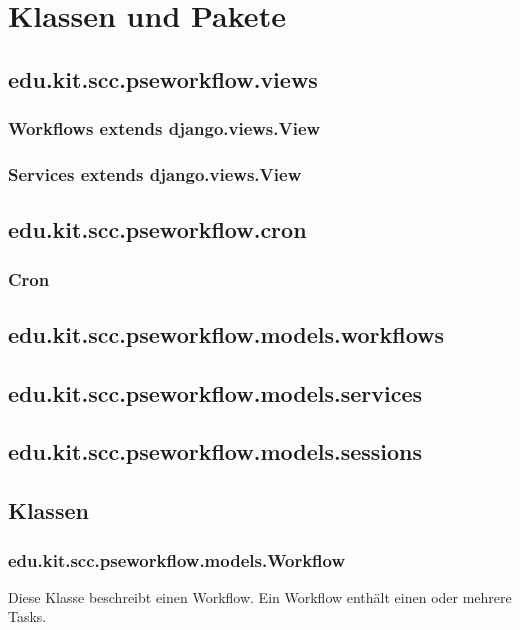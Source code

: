 \chapter{Klassen und Pakete}

    \section{edu.kit.scc.pseworkflow.views}

		\subsection{Workflows\newline
		extends django.views.View}

		\subsection{Services\newline
		extends django.views.View}

    \section{edu.kit.scc.pseworkflow.cron}

		\subsection{Cron}

    \section{edu.kit.scc.pseworkflow.models.workflows}

    \section{edu.kit.scc.pseworkflow.models.services}

    \section{edu.kit.scc.pseworkflow.models.sessions}
        
    \section{Klassen}
        \subsection{edu.kit.scc.pseworkflow.models.Workflow}
	        Diese Klasse beschreibt einen Workflow. Ein Workflow enthält einen oder mehrere Tasks.
                    
